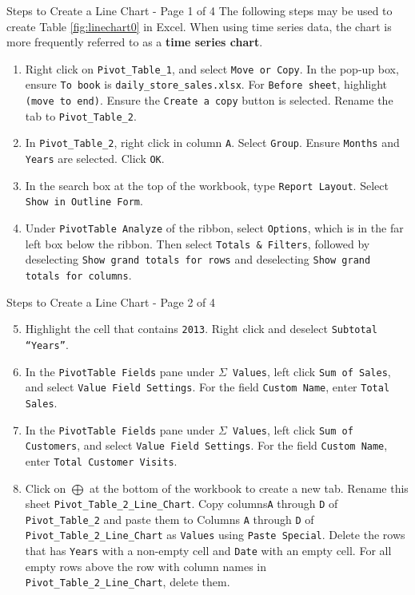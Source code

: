 \documentclass[pdf]{beamer}
\newcommand{\empr}[1]{{\color{franklinblue}\textbf{#1}}}
\theoremstyle{remark}
\theoremstyle{definition}
\begin{document}
\begin{frame}[t]{Steps to Create a Line Chart - Page 1 of 4}
  The following steps may be used to create Table \ref{fig:linechart0} in Excel.  When using time series data, the chart is more frequently referred to as a \empr{time series chart}.\\
 \vspace{0.5ex}
 \small 
\begin{enumerate}
\item Right click on \texttt{Pivot\_Table\_1}, and select  \texttt{Move or Copy}.  In the pop-up box, ensure  \texttt{To book} is  \texttt{daily\_store\_sales.xlsx}.  For  \texttt{Before sheet}, highlight  \texttt{(move to end)}.  Ensure the  \texttt{Create a copy} button is selected.  Rename the tab to  \texttt{Pivot\_Table\_2}.
\item In \texttt{Pivot\_Table\_2}, right click in column \texttt{A}. Select \texttt{Group}.  Ensure \texttt{Months} and \texttt{Years} are selected. Click \texttt{OK}.
\item In the search box at the top of the workbook, type \texttt{Report Layout}. Select \texttt{Show in Outline Form}.
\item Under \texttt{PivotTable Analyze} of the ribbon, select \texttt{Options}, which is in the far left box below the ribbon.  Then select \texttt{Totals \& Filters}, followed by deselecting \texttt{Show grand totals for rows} and deselecting \texttt{Show grand totals for columns}.
\end{enumerate}
\end{frame}

\begin{frame}[t]{Steps to Create a Line Chart - Page 2 of 4}
 \small 
\begin{enumerate}
  \setcounter{enumi}{4}
\item  Highlight the cell that contains \texttt{2013}.  Right click and deselect \texttt{Subtotal ``Years''}.
\item In the \texttt{PivotTable Fields} pane under \texttt{$\Sigma$ Values}, left click \texttt{Sum of Sales}, and select \texttt{Value Field Settings}.  For the field \texttt{Custom Name}, enter \texttt{Total Sales}.
\item In the \texttt{PivotTable Fields} pane under \texttt{$\Sigma$ Values}, left click \texttt{Sum of Customers}, and select \texttt{Value Field Settings}.  For the field \texttt{Custom Name}, enter \texttt{Total Customer Visits}.
\item Click on \texttt{$\bigoplus$} at the bottom of the workbook to create a new tab.  Rename this sheet \texttt{Pivot\_Table\_2\_Line\_Chart}.  Copy columns\texttt{A} through \texttt{D} of \texttt{Pivot\_Table\_2} and paste them to Columns \texttt{A} through \texttt{D} of \texttt{Pivot\_Table\_2\_Line\_Chart}  as \texttt{Values} using \texttt{Paste Special}.  Delete the rows that has \texttt{Years} with a non-empty cell and \texttt{Date} with an empty cell. For all empty rows above the row with column names in \texttt{Pivot\_Table\_2\_Line\_Chart}, delete them.  
\end{enumerate}
\end{frame}
\end{document}
